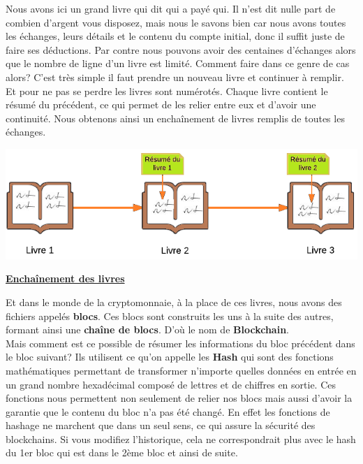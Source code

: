 \documentclass[12pt]{report}
\begin{document}
Nous avons ici un grand livre qui dit qui a payé qui. Il n'est dit nulle part de combien d'argent vous disposez, mais nous le savons bien car nous avons toutes les échanges, leurs détails et le contenu du compte initial, donc il suffit juste de faire ses déductions. Par contre nous pouvons avoir des centaines d'échanges alors que le nombre de ligne d'un livre est limité. Comment faire dans ce genre de cas alors? C'est très simple il faut prendre un nouveau livre et continuer à remplir. Et pour ne pas se perdre les livres sont numérotés. Chaque livre contient le résumé du précédent, ce qui permet de les relier entre eux et d'avoir une continuité. Nous obtenons ainsi un enchaînement de livres remplis de toutes les échanges.\\

\begin{center}
    \includegraphics[width=1\textwidth]{livre_compte_2}

    \textbf{\underline{Enchaînement des livres}} \\[1cm]
\end{center}

\hspace{1cm} Et dans le monde de la cryptomonnaie, à la place de ces livres, nous avons des fichiers appelés \textbf{blocs}. Ces blocs sont construits les uns à la suite des autres, formant ainsi une \textbf{chaîne de blocs}. D'où le nom de \textbf{Blockchain}.\\

\hspace{1cm} Mais comment est ce possible de résumer les informations du bloc précédent dans le bloc suivant? Ils utilisent ce qu'on appelle les \textbf{Hash} qui sont des fonctions mathématiques permettant de transformer n'importe quelles données en entrée en un grand nombre hexadécimal composé de lettres et de chiffres en sortie. Ces fonctions nous permettent non seulement de relier nos blocs mais aussi d'avoir la garantie que le contenu du bloc n'a pas été changé. En effet les fonctions de hashage ne marchent que dans un seul sens, ce qui assure la sécurité des blockchains. Si vous modifiez l'historique, cela ne correspondrait plus avec le hash du 1er bloc qui est dans le 2ème bloc et ainsi de suite.\\
\end{document}
